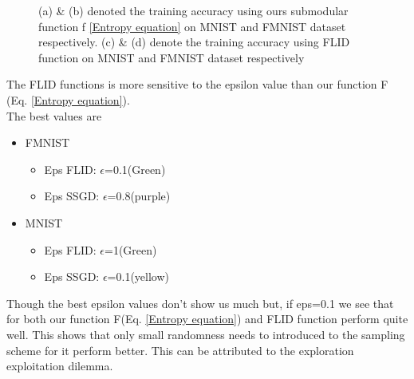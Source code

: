 \documentclass[a4paper,twoside]{iiththesis}
\theoremstyle{definition}
\theoremstyle{definition}
\theoremstyle{remark}
\begin{document}
\begin{figure}
    \caption{(a) \& (b) denoted the training accuracy using ours submodular function f \ref{Entropy equation}  on MNIST and FMNIST dataset respectively. (c) \& (d) denote the training accuracy using FLID function on MNIST and FMNIST dataset respectively}
    \label{fig:Oxford}
\end{figure}

The FLID functions is more sensitive to the epsilon value than our function F (Eq. \ref{Entropy equation}). \\ 
The best values are 
\begin{itemize}
\item FMNIST
\begin{itemize}
\item Eps FLID: $\epsilon$=0.1(Green)
\item Eps SSGD: $\epsilon$=0.8(purple)
\end{itemize}
\item MNIST
\begin{itemize}
\item Eps FLID: $\epsilon$=1(Green)
\item Eps SSGD: $\epsilon$=0.1(yellow)
\end{itemize}
\end{itemize}
Though the best epsilon values don't show us much but, if eps=0.1 we see that for both our function F(Eq. \ref{Entropy equation}) and FLID function perform quite well. This shows that only small randomness needs to introduced to the sampling scheme for it perform better. This can be attributed to the exploration exploitation dilemma.
\end{document}
